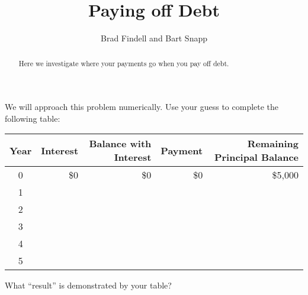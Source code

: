 \documentclass[,nooutcomes]{ximera}
\title{Paying off Debt}
\author{Brad Findell and Bart Snapp}
\begin{document}
\begin{abstract}
Here we investigate where your payments go when you pay off debt.
\end{abstract}
\maketitle


\begin{question}
We will approach this problem numerically.  Use your guess to complete the following table:  

\def\arraystretch{2}
\begin{table}[h]
\begin{tabular}{|c|r|r|r|r|}
\hline
Year & Interest & Balance with Interest & Payment & Remaining Principal Balance \\ \hline
0    &   \$0   &    \$0           &   \$0    & \$5,000                  \\ \hline
1    &          &                     &         &                             \\ \hline
2    &          &                     &         &                             \\ \hline
3    &          &                     &         &                             \\ \hline
4    &          &                     &         &                             \\ \hline
5    &          &                     &         &                             \\ \hline
\end{tabular}
\end{table}
What ``result'' is demonstrated by your table?  
\begin{freeResponse}
\end{freeResponse}
\end{question}
\end{document}

